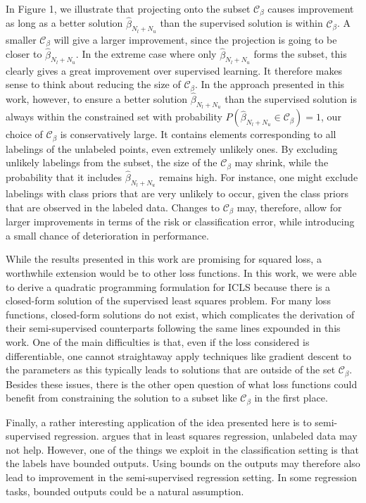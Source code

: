 \documentclass[smallcondensed]{svjour3}
\newcommand{\Cb}{\mathcal{C}_{\beta}}
\begin{document}
In Figure 1, we illustrate that projecting onto the subset $\Cb$ causes improvement as long as a better solution $\hat{\beta}_{N_l+N_u}$ than the supervised solution is within $\Cb$. A smaller $\Cb$ will give a larger improvement, since the projection is going to be closer to $\hat{\beta}_{N_l+N_u}$. In the extreme case where only $\hat{\beta}_{N_l+N_u}$ forms the subset, this clearly gives a great improvement over supervised learning. It therefore makes sense to think about reducing the size of $\Cb$. In the approach presented in this work, however, to ensure a better solution $\hat{\beta}_{N_l+N_u}$ than the supervised solution is always within the constrained set with probability $P(\hat{\beta}_{N_l+N_u} \in \Cb)=1$, our choice of $\Cb$ is conservatively large. It contains elements corresponding to all labelings of the unlabeled points,  even extremely unlikely ones. By excluding unlikely labelings from the subset, the size of the $\Cb$ may shrink, while the probability that it includes $\hat{\beta}_{N_l+N_u}$ remains high. For instance, one might exclude labelings with class priors that are very unlikely to occur, given the class priors that are observed in the labeled data. Changes to $\Cb$ may, therefore, allow for larger improvements in terms of the risk or classification error, while introducing a small chance of deterioration in performance.

While the results presented in this work are promising for squared loss, a worthwhile extension would be to other loss functions. In this work, we were able to derive a quadratic programming formulation for ICLS because there is a closed-form solution of the supervised least squares problem. For many loss functions, closed-form solutions do not exist, which complicates the derivation of their semi-supervised counterparts following the same lines expounded in this work. One of the main difficulties is that, even if the loss considered is differentiable, one cannot straightaway apply techniques like gradient descent to the parameters as this typically leads to solutions that are outside of the set $\Cb$. Besides these issues, there is the other open question of what loss functions could benefit from constraining the solution to a subset like $\Cb$ in the first place.

Finally, a rather interesting application of the idea presented here is to semi-supervised regression. \cite{Culp2008} argues that in least squares regression, unlabeled data may not help. However, one of the things we exploit in the classification setting is that the labels have bounded outputs. Using bounds on the outputs may therefore also lead to improvement in the semi-supervised regression setting. In some regression tasks, bounded outputs could be a natural assumption.
\end{document}
